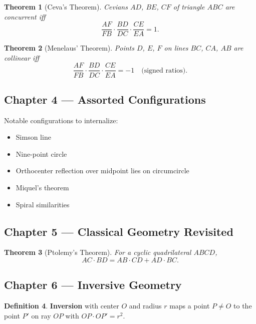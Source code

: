 \documentclass[11pt, letterpaper]{article}
\newtheorem{theorem}{Theorem}[section]
\theoremstyle{definition}
\newtheorem{definition}[theorem]{Definition}
\theoremstyle{remark}
\begin{document}
\begin{theorem}[Ceva's Theorem]
  Cevians $AD$, $BE$, $CF$ of triangle $ABC$ are concurrent iff
  \[
    \frac{AF}{FB} \cdot \frac{BD}{DC} \cdot \frac{CE}{EA} = 1.
  \]
\end{theorem}

\begin{theorem}[Menelaus' Theorem]
  Points $D$, $E$, $F$ on lines $BC$, $CA$, $AB$ are collinear iff
  \[
    \frac{AF}{FB} \cdot \frac{BD}{DC} \cdot \frac{CE}{EA} = -1
    \quad \text{(signed ratios)}.
  \]
\end{theorem}

\subsection{Chapter 4 — Assorted Configurations}

Notable configurations to internalize:
\begin{itemize}
  \item Simson line
  \item Nine-point circle
  \item Orthocenter reflection over midpoint lies on circumcircle
  \item Miquel's theorem
  \item Spiral similarities
\end{itemize}

\subsection{Chapter 5 — Classical Geometry Revisited}

\begin{theorem}[Ptolemy's Theorem]
  For a cyclic quadrilateral $ABCD$,
  \[
    AC \cdot BD = AB \cdot CD + AD \cdot BC.
  \]
\end{theorem}

\subsection{Chapter 6 — Inversive Geometry}

\begin{definition}
  \textbf{Inversion} with center $O$ and radius $r$ maps a point $P \neq O$
  to the point $P'$ on ray $OP$ with $OP \cdot OP' = r^2$.
\end{definition}
\end{document}

